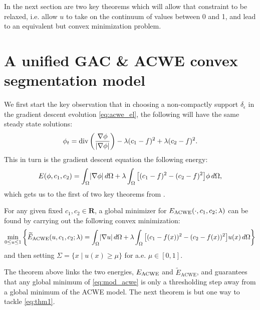In the next section are two key theorems which will allow that constraint to be relaxed, i.e. allow $u$ to take on the continuum of values between 0 and 1, and lead to an equivalent but convex minimization problem.

\section{A unified GAC \& ACWE convex segmentation model}
We first start the key observation that in choosing a non-compactly support $\delta_\epsilon$ in the gradient descent evolution \eqref{eq:acwe_el}, the following will have the same steady state solutions: 
\begin{align*}
\phi_t = \operatorname{div}\left(\frac{\nabla \phi}{\lvert\nabla \phi\rvert} \right) 
- \lambda (c_1 - f)^2 + \lambda (c_2 - f)^2 .
\end{align*}
This in turn is the gradient descent equation the following energy:
\begin{align}
E(\phi, c_1, c_2) 
= \int_\Omega \lvert\nabla \phi\rvert \,d\Omega 
+ \lambda \int_\Omega \big[ (c_1 - f)^2 - (c_2 - f)^2 \big] \phi \,d\Omega ,
\label{eq:mod_acwe}
\end{align}
which gets us to the first of two key theorems from \cite{chan2006algorithms}.

\begin{thm}
	For any given fixed $c_1, c_2 \in \mathbf{R}$, a global minimizer for $E_\textrm{ACWE}(\cdot, c_1, c_2; \lambda)$ can be found by carrying out the following convex minimization: 
	\begin{align}
	\min_{0\leq u \leq 1}\left\{
		\widetilde E_{\textrm{ACWE}} (u, c_1, c_2; \lambda)
		=
		\int_{\Omega} \lvert\nabla u\rvert \,d\Omega 
	+ \lambda\int_{\Omega} \big[ (c_1 - f(x) )^2 - (c_2 - f(x))^2 \big] u(x) \,d\Omega
	\right\}
	\label{eq:thm1}
	\end{align}
	and then setting $\Sigma = \{ x \mid u(x) \geq \mu \}$ for a.e. $\mu \in [0, 1]$.
	\label{thm:1}
\end{thm}
The theorem above links the two energies, $E_\textrm{ACWE}$ and $\widetilde E_\textrm{ACWE}$,
and guarantees that any global minimum of \eqref{eq:mod_acwe} is only a thresholding step away from a global minimum of the ACWE model. The next theorem is but one way to tackle \eqref{eq:thm1}.

